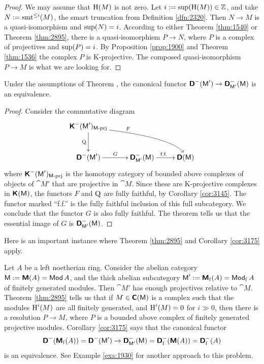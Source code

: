 \begin{proof}
We may assume that $\operatorname{H}(M)$ is not zero. 
Let $i := \operatorname{sup}(\operatorname{H}(M)) \in \mathbb{Z}$, and take $N := \operatorname{smt}^{\leq i}(M)$,
the smart truncation from  Definition \ref{dfn:2320}. Then 
$N \to M$ is a quasi-isomorphism and $\operatorname{sup}(N) = i$.
According to either Theorem \ref{thm:1540} or Theorem \ref{thm:2895},
there is a quasi-isomorphism $P \to N$, where $P$ is a complex 
of projectives and $\operatorname{sup}(P) = i$. 
By Proposition \ref{prop:1900} and Theorem \ref{thm:1536} the complex $P$ is 
K-projective. The composed quasi-isomorphism $P \to M$ is what we are looking 
for.
\end{proof}

\begin{cor} \label{cor:3175}
Under the assumptions of Theorem \tup{\ref{thm:2895}}, the canonical functor 
$\boldsymbol{\mathsf{D}}^-(\operatorname{\mathsf{M}}') \to \boldsymbol{\mathsf{D}}^-_{\operatorname{\mathsf{M}}'}(\operatorname{\mathsf{M}})$
is an equivalence. 
\end{cor}

\begin{proof}
Consider the commutative diagram 
\[ \UseTips \xymatrix @C=6ex @R=6ex {
\dcat{K}^-(\cat{M}')_{\catt{M}\tup{-}\mrm{prj}}
\ar@(l,u)[drr]^{F}
\ar[d]_{\opn{Q}}
&
\\
\dcat{D}^-(\cat{M}')
\ar[r]^{G}
& 
\dcat{D}^-_{\cat{M}'}(\cat{M})
\ar[r]^{\tup{f.f.}}
& 
\dcat{D}(\cat{M})
} \]
where $\boldsymbol{\mathsf{K}}^-(\operatorname{\mathsf{M}}')_{\mathrm{\mathsf{M}}\textup{-}\mathrm{prj}}$ is the homotopy 
category of bounded above complexes of objects of $\cat{M}'$ that are 
projective in $\cat{M}$. Since these are K-projective complexes in 
$\boldsymbol{\mathsf{K}}(\operatorname{\mathsf{M}})$, the functors $F$ and $\operatorname{Q}$ are fully faithful, by 
Corollary \ref{cor:3145}. The functor marked ``f.f.'' is the fully faithful 
inclusion of this full subcategory. We conclude that the functor $G$ is also 
fully faithful. The theorem tells us that the essential 
image of $G$ is $\boldsymbol{\mathsf{D}}^-_{\operatorname{\mathsf{M}}'}(\operatorname{\mathsf{M}})$. 
\end{proof}

Here is an important instance where Theorem \ref{thm:2895} and  
Corollary \ref{cor:3175} apply. 

\begin{exa} \label{exa:2900}
Let $A$ be a left noetherian ring. Consider the abelian category 
$\operatorname{\mathsf{M}} := \boldsymbol{\mathsf{M}}(A) = \operatorname{\mathsf{Mod}} A$, and the thick abelian subcategory 
$\operatorname{\mathsf{M}}' := \boldsymbol{\mathsf{M}}_{\mathrm{f}}(A) = \operatorname{\mathsf{Mod}}_{\mathrm{f}} A$ of finitely 
generated modules. Then $\cat{M}'$ has enough projectives relative to 
$\cat{M}$. 
Theorem \ref{thm:2895} tells us that if 
$M \in \boldsymbol{\mathsf{C}}(\operatorname{\mathsf{M}})$ is a complex such that the modules 
$\operatorname{H}^i(M)$ are all finitely generated, and $\operatorname{H}^i(M) = 0$ for 
$i \gg 0$, then there is a resolution $P \to M$, where $P$ is a bounded above 
complex of finitely generated projective modules. 
Corollary \ref{cor:3175} says that the canonical functor 
\[ \boldsymbol{\mathsf{D}}^{-}(\boldsymbol{\mathsf{M}}_{\mathrm{f}}(A)) = \boldsymbol{\mathsf{D}}^{-}(\operatorname{\mathsf{M}}') \to 
\boldsymbol{\mathsf{D}}^{-}_{\operatorname{\mathsf{M}}'}(\operatorname{\mathsf{M}}) = \boldsymbol{\mathsf{D}}^{-}_{\mathrm{f}}(\boldsymbol{\mathsf{M}}(A))
= \boldsymbol{\mathsf{D}}^{-}_{\mathrm{f}}(A) \]
is an equivalence. 
See Example \ref{exa:1930} for another approach to this problem. 
\end{exa}

